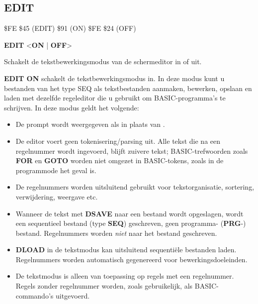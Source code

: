 \subsection{EDIT}
\begin{description}[leftmargin=2cm,style=nextline]
\item [Token:]    \$FE \$45 (EDIT) \$91 (ON) \$FE \$24 (OFF)

\item [Formaat:]   {\bf EDIT} <{\bf ON} | {\bf OFF}>

\item [Gebruik:]    Schakelt de tekstbewerkingsmodus van de schermeditor in of uit.

                  {\bf EDIT ON} schakelt de tekstbewerkingsmodus in. In deze modus kunt u bestanden van het type SEQ als tekstbestanden aanmaken, bewerken, opslaan en laden met dezelfde regeleditor die u gebruikt om BASIC-programma's te schrijven. In deze modus geldt het volgende:

                  \begin{itemize}
                     \item De prompt wordt weergegeven als  in plaats van .                     \item De editor voert geen tokenisering/parsing uit. Alle tekst die na een regelnummer wordt ingevoerd, blijft zuivere tekst; BASIC-trefwoorden zoals {\bf FOR} en {\bf GOTO} worden niet omgezet in BASIC-tokens, zoals in de programmode het geval is.                     \item De regelnummers worden uitsluitend gebruikt voor tekstorganisatie, sortering, verwijdering, weergave etc.                     \item Wanneer de tekst met {\bf DSAVE} naar een bestand wordt opgeslagen, wordt een sequentieel bestand (type {\bf SEQ}) geschreven, geen programma- ({\bf PRG}-) bestand. Regelnummers worden {\em niet} naar het bestand geschreven.                     \item {\bf DLOAD} in de tekstmodus kan uitsluitend sequentiële bestanden laden. Regelnummers worden automatisch gegenereerd voor bewerkingsdoeleinden.                     \item De tekstmodus is alleen van toepassing op regels met een regelnummer. Regels zonder regelnummer worden, zoals gebruikelijk, als BASIC-commando's uitgevoerd.
                  \end{itemize}


\end{description}

